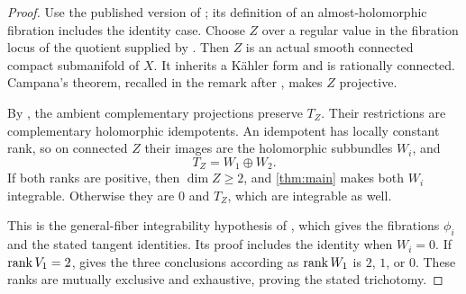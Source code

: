 \begin{proof}
Use the published version of \cite{Hor08}; its definition of an
almost-holomorphic fibration includes the identity case. Choose \(Z\)
over a regular value in the fibration locus of the quotient supplied by
\cite[Definition~2.9 and Theorem~2.10]{Hor08}. Then \(Z\) is an actual
smooth connected compact submanifold of \(X\). It inherits a K\"ahler
form and is rationally connected. Campana's theorem, recalled in the
remark after \cite[Definition~2.8]{Hor08}, makes \(Z\) projective.

By \cite[Proposition~3.16]{Hor08}, the ambient complementary projections
preserve \(T_Z\). Their restrictions are complementary holomorphic
idempotents. An idempotent has locally constant rank, so on connected
\(Z\) their images are the holomorphic subbundles \(W_i\), and
\[
T_Z=W_1\oplus W_2.
\]
If both ranks are positive, then \(\dim Z\ge2\), and \cref{thm:main}
makes both \(W_i\) integrable. Otherwise they are \(0\) and \(T_Z\),
which are integrable as well.

This is the general-fiber integrability hypothesis of
\cite[Theorem~1.3]{Hor08}, which gives the fibrations \(\phi_i\) and the
stated tangent identities. Its proof includes the identity when
\(W_i=0\). If \(\operatorname{rank} V_1=2\), \cite[Theorem~1.4]{Hor08} gives the three
conclusions according as \(\operatorname{rank} W_1\) is \(2\), \(1\), or \(0\).
These ranks are mutually exclusive and exhaustive, proving the stated
trichotomy.
\end{proof}
